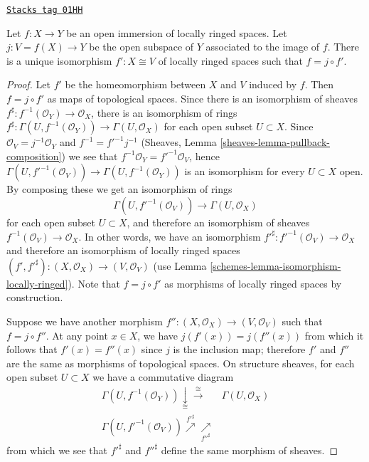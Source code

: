 \begin{lemma}
\label{schemes-lemma-open-immersion}
\href{https://stacks.math.columbia.edu/tag/01HH}{\texttt{Stacks tag 01HH}}

Let $f : X \to Y$ be an open immersion of
locally ringed spaces. Let $j : V = f(X) \to Y$
be the open subspace of $Y$ associated to the image of $f$.
There is a unique isomorphism $f' : X \cong V$ of
locally ringed spaces such that $f = j \circ f'$.
\end{lemma}

\begin{proof}

Let $f'$ be the homeomorphism between $X$ and $V$ induced by $f$. Then
$f = j \circ f'$ as maps of topological spaces. Since there
is an isomorphism of sheaves
$f^\sharp : f^{-1}(\mathcal{O}_Y) \to \mathcal{O}_X$, there is an isomorphism
of rings
$f^\sharp : \Gamma(U, f^{-1}(\mathcal{O}_Y)) \to \Gamma(U, \mathcal{O}_X)$
for each open subset $U \subset X$. Since
$\mathcal{O}_V = j^{-1}\mathcal{O}_Y$ and $f^{-1} = f'^{-1} j^{-1}$
(Sheaves, Lemma \ref{sheaves-lemma-pullback-composition}) we
see that $f^{-1}\mathcal{O}_Y = f'^{-1}\mathcal{O}_V$, hence
$\Gamma(U, f'^{-1}(\mathcal{O}_V)) \to \Gamma(U, f^{-1}(\mathcal{O}_Y))$
is an isomorphism
for every $U \subset X$ open. By composing these we get an isomorphism of rings
$$
\Gamma(U, f'^{-1}(\mathcal{O}_V)) \to \Gamma(U, \mathcal{O}_X)
$$
for each open subset $U \subset X$, and therefore an isomorphism of sheaves
$f^{-1}(\mathcal{O}_V) \to \mathcal{O}_X$. In other words, we have an
isomorphism $f'^{\sharp} : f'^{-1}(\mathcal{O}_V) \to \mathcal{O}_X$ and
therefore an isomorphism of locally ringed spaces
$(f', f'^{\sharp}) : (X, \mathcal{O}_X) \to (V, \mathcal{O}_V)$
(use Lemma \ref{schemes-lemma-isomorphism-locally-ringed}).
Note that $f = j \circ f'$ as morphisms of locally ringed spaces
by construction.

\medskip\noindent
Suppose we have another morphism
$f'' : (X, \mathcal{O}_X) \to (V, \mathcal{O}_V)$ such that $f = j \circ f''$.
At any point $x \in X$, we have $j(f'(x)) = j(f''(x))$ from which it follows
that $f'(x) = f''(x)$ since $j$ is the inclusion map; therefore $f'$ and $f''$
are the same as morphisms of topological spaces. On structure sheaves,
for each open subset $U \subset X$ we have a commutative diagram
$$
\begin{array}{cc}\Gamma(U, f^{-1}(\mathcal{O}_Y)) \underset{\cong}{\downarrow}\overset{\cong}{\longrightarrow} & \Gamma(U, \mathcal{O}_X) \\ \Gamma(U, f'^{-1}(\mathcal{O}_V)) \overset{f'^\sharp}{\nearrow}\underset{f''^\sharp}{\nearrow} & \end{array}
$$
from which we see that $f'^\sharp$ and $f''^\sharp$ define
the same morphism of sheaves.
\end{proof}

